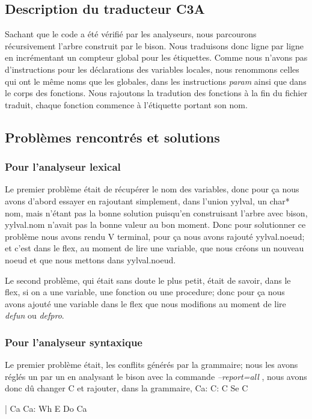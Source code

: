 \documentclass[10pt,a4paper]{article}
\begin{document}
\subsection{Description du traducteur C3A}
Sachant que le code a été vérifié par les analyseurs, nous parcourons récursivement l'arbre construit par le bison. Nous traduisons donc ligne par ligne en incrémentant un compteur global pour les étiquettes. Comme nous n'avons pas d'instructions pour les déclarations des variables locales, nous renommons celles qui ont le même noms que les globales, dans les instructions \textit{param} ainsi que dans le corps des fonctions. Nous rajoutons la tradution des fonctions à la fin du fichier traduit, chaque fonction commence à l'étiquette portant son nom.
\subsection{Problèmes rencontrés et solutions}
\subsubsection{Pour l'analyseur lexical}
Le premier problème était de récupérer le nom des variables, donc pour ça nous avons d'abord essayer en rajoutant simplement, dans l'union yylval, un char* nom, mais n'étant pas la bonne solution puisqu'en construisant l'arbre avec bison, yylval.nom n'avait pas la bonne valeur au bon moment. Donc pour solutionner ce problème nous avons rendu V terminal, pour ça nous avons rajouté yylval.noeud; et c'est dans le flex, au moment de lire une variable, que nous créons un nouveau noeud et que nous mettons dans yylval.noeud.

Le second problème, qui était sans doute le plus petit, était de savoir, dans le flex, si on a une variable, une fonction ou une procedure; donc pour ça nous avons ajouté une variable dans le flex que nous modifions au moment de lire \textit{defun} ou \textit{defpro}.
\subsubsection {Pour l'analyseur syntaxique}
Le premier problème était, les conflits générés par la grammaire; nous les avons réglés un par un en analysant le bison avec la commande \textit{--report=all} , nous avons donc dû changer C et rajouter, dans la grammaire, Ca:\newline 
C: C Se C
    
| Ca\newline\newline
Ca: Wh E Do Ca
\end{document}
